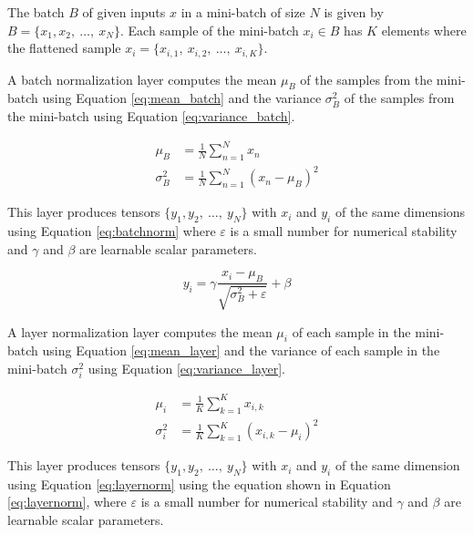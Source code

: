 
The batch $B$ of given inputs $x$ in a mini-batch of size $N$ is given by $B = \{x_1, x_2,\ \ldots,\ x_N\}$. Each sample of the mini-batch $x_i \in B$ has $K$ elements where the flattened sample $x_i = \{x_{i, 1},\ x_{i, 2},\ \ldots,\ x_{i, K}\}$.

A batch normalization layer computes the mean $\mu_B$ of the samples from the mini-batch using Equation \ref{eq:mean_batch} and the variance $\sigma^2_B$ of the samples from the mini-batch using Equation \ref{eq:variance_batch}.

\begin{align}
    \mu_B &= \frac{1}{N}\sum_{n=1}^{N}x_{n} \label{eq:mean_batch} \\
    \sigma^2_B  &= \frac{1}{N}\sum_{n=1}^{N}(x_{n} - \mu_B)^2 \label{eq:variance_batch}
\end{align}

This layer produces tensors $\{y_1, y_2,\ \ldots,\ y_N\}$ with $x_i$ and $y_i$ of the same dimensions using Equation \ref{eq:batchnorm} where $\varepsilon$ is a small number for numerical stability and $\gamma$ and $\beta$ are learnable scalar parameters. 

\begin{equation}
    y_i = \gamma \frac{x_i - \mu_B}{\sqrt{\sigma_{B}^2 + \varepsilon}} + \beta
    \label{eq:batchnorm}
\end{equation}


A layer normalization layer computes the mean $\mu_i$ of each sample in the mini-batch using Equation \ref{eq:mean_layer} and the variance of each sample in the mini-batch $\sigma^2_i$ using Equation \ref{eq:variance_layer}.

\begin{align}
    \mu_i &= \frac{1}{K}\sum_{k=1}^{K}x_{i,k} \label{eq:mean_layer} \\
    \sigma^2_i  &= \frac{1}{K}\sum_{k=1}^{K}(x_{i,k} - \mu_i)^2 \label{eq:variance_layer}
\end{align}

This layer produces tensors $\{y_1, y_2,\ \ldots,\ y_N\}$ with $x_i$ and $y_i$ of the same dimension using Equation \ref{eq:layernorm} using the equation shown in Equation \ref{eq:layernorm}, where $\varepsilon$ is a small number for numerical stability and $\gamma$ and $\beta$ are learnable scalar parameters.

